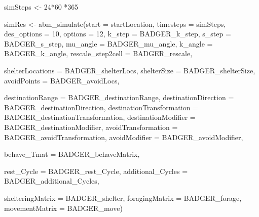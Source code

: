 \documentclass[10pt,a4paper]{article}
\newenvironment{Shaded}{}{}
\newcommand{\AttributeTok}[1]{#1}
\newcommand{\DecValTok}[1]{#1}
\newcommand{\FunctionTok}[1]{#1}
\newcommand{\NormalTok}[1]{#1}
\newcommand{\OtherTok}[1]{#1}
\newcommand{\SpecialCharTok}[1]{#1}
\begin{document}
\begin{Shaded}
\begin{Highlighting}[]
\NormalTok{simSteps }\OtherTok{\textless{}{-}} \DecValTok{24}\SpecialCharTok{*}\DecValTok{60} \SpecialCharTok{*}\DecValTok{365}

\NormalTok{simRes }\OtherTok{\textless{}{-}} \FunctionTok{abm\_simulate}\NormalTok{(}\AttributeTok{start =}\NormalTok{ startLocation,}
                       \AttributeTok{timesteps =}\NormalTok{ simSteps,}
                       \AttributeTok{des\_options =} \DecValTok{10}\NormalTok{,}
                       \AttributeTok{options =} \DecValTok{12}\NormalTok{,}
                       \AttributeTok{k\_step =}\NormalTok{ BADGER\_k\_step,}
                       \AttributeTok{s\_step =}\NormalTok{ BADGER\_s\_step,}
                       \AttributeTok{mu\_angle =}\NormalTok{ BADGER\_mu\_angle,}
                       \AttributeTok{k\_angle =}\NormalTok{ BADGER\_k\_angle,}
                       \AttributeTok{rescale\_step2cell =}\NormalTok{ BADGER\_rescale,}
                       
                       \AttributeTok{shelterLocations =}\NormalTok{ BADGER\_shelterLocs,}
                       \AttributeTok{shelterSize =}\NormalTok{ BADGER\_shelterSize,}
                       \AttributeTok{avoidPoints =}\NormalTok{ BADGER\_avoidLocs,}
                       
                       \AttributeTok{destinationRange =}\NormalTok{ BADGER\_destinationRange,}
                       \AttributeTok{destinationDirection =}\NormalTok{ BADGER\_destinationDirection,}
                       \AttributeTok{destinationTransformation =}\NormalTok{ BADGER\_destinationTransformation,}
                       \AttributeTok{destinationModifier =}\NormalTok{ BADGER\_destinationModifier,}
                       \AttributeTok{avoidTransformation =}\NormalTok{ BADGER\_avoidTransformation,}
                       \AttributeTok{avoidModifier =}\NormalTok{ BADGER\_avoidModifier,}
                       
                       \AttributeTok{behave\_Tmat =}\NormalTok{ BADGER\_behaveMatrix,}
                       
                       \AttributeTok{rest\_Cycle =}\NormalTok{ BADGER\_rest\_Cycle,}
                       \AttributeTok{additional\_Cycles =}\NormalTok{ BADGER\_additional\_Cycles,}
                       
                       \AttributeTok{shelteringMatrix =}\NormalTok{ BADGER\_shelter,}
                       \AttributeTok{foragingMatrix =}\NormalTok{ BADGER\_forage,}
                       \AttributeTok{movementMatrix =}\NormalTok{ BADGER\_move)}
\end{Highlighting}
\end{Shaded}
\end{document}

